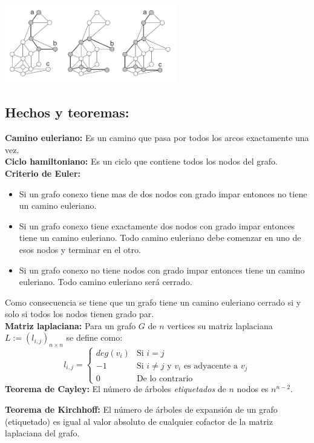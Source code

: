 \begin{multicols}{2}
\begin{center}
\includegraphics[width=75mm]{./graph_theory/path.png}
\end{center}
\subsection{Hechos y teoremas:}

\textbf{Camino euleriano:} Es un camino que pasa por todos los arcos exactamente una vez.\\
\textbf{Ciclo hamiltoniano:} Es un ciclo que contiene todos los nodos del grafo.\\
\textbf{Criterio de Euler:}
\begin{itemize}
\item Si un grafo conexo tiene mas de dos nodos con grado impar entonces no tiene un camino euleriano.
\item Si un grafo conexo tiene exactamente dos nodos con grado impar entonces tiene un camino euleriano. Todo camino euleriano debe comenzar en uno de esos nodos y terminar en el otro.
\item Si un grafo conexo no tiene nodos con grado impar entonces tiene un camino euleriano. Todo camino euleriano ser\'a cerrado.
\end{itemize}
Como consecuencia se tiene que un grafo tiene un camino euleriano cerrado si y solo si todos los nodos tienen grado par.\\
\textbf{Matriz laplaciana:} Para un grafo $G$ de $n$ vertices su matriz laplaciana $L:=(l_{i,j})_{n\times n}$ se define como:
\[
	l_{i,j}= \left\{ \begin{array}{ll}
		deg(v_i) &  \mbox{Si $i=j$}\\ 
		-1 & \mbox{Si $i\neq j$ y $v_i$ es adyacente a $v_j$}\\
		0 & \mbox{De lo contrario} \end{array} \right.
\]
\textbf{Teorema de Cayley:} El n\'umero de \'arboles \textit{etiquetados} de $n$ nodos es $n^{n-2}$.

\textbf{Teorema de Kirchhoff:} El n\'umero de \'arboles de expansi\'on de un grafo (etiquetado) es igual al valor absoluto de cualquier cofactor de la matriz laplaciana del grafo.
\end{multicols}
